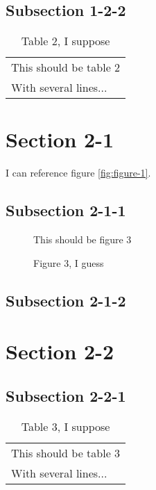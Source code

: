 \documentclass[10pt]{article}
\begin{document}
\subsection{Subsection 1-2-2}
\label{sec:subsection-1-2-2}

\begin{table}
  \centering
  \begin{tabular}{l}
    This should be table 2\\
    With several lines...
  \end{tabular}
  \caption{Table 2, I suppose}
  \label{tab:table-2}
\end{table}


\section{Section 2-1}
\label{sec:section-2-1}
\secttoc
\sectlot
\sectlof

I can reference figure \ref{fig:figure-1}.

\subsection{Subsection 2-1-1}
\label{sec:subsection-2-1-1}

\begin{figure}
  \centering
  This should be figure 3
  \caption{Figure 3, I guess}
  \label{fig:figure-3}
\end{figure}


\subsection{Subsection 2-1-2}
\label{sec:subsection-2-1-2}

\section{Section 2-2}
\label{sec:section-2-2}
\secttoc
\sectlot
\sectlof

\subsection{Subsection 2-2-1}
\label{sec:subsection-2-2-1}

\begin{table}
  \centering
  \begin{tabular}{l}
    This should be table 3\\
    With several lines...
  \end{tabular}
  \caption{Table 3, I suppose}
  \label{tab:table-3}
\end{table}
\end{document}
